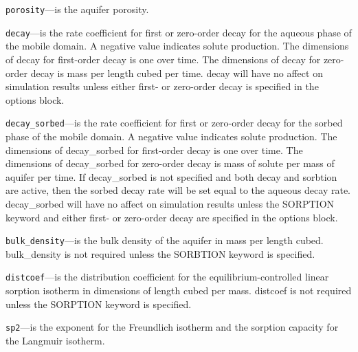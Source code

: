 \begin{description}
\item \texttt{porosity}---is the aquifer porosity.

\item \texttt{decay}---is the rate coefficient for first or zero-order decay for the aqueous phase of the mobile domain.  A negative value indicates solute production.  The dimensions of decay for first-order decay is one over time.  The dimensions of decay for zero-order decay is mass per length cubed per time.  decay will have no affect on simulation results unless either first- or zero-order decay is specified in the options block.

\item \texttt{decay\_sorbed}---is the rate coefficient for first or zero-order decay for the sorbed phase of the mobile domain.  A negative value indicates solute production.  The dimensions of decay\_sorbed for first-order decay is one over time.  The dimensions of decay\_sorbed for zero-order decay is mass of solute per mass of aquifer per time.  If decay\_sorbed is not specified and both decay and sorbtion are active, then the sorbed decay rate will be set equal to the aqueous decay rate.  decay\_sorbed will have no affect on simulation results unless the SORPTION keyword and either first- or zero-order decay are specified in the options block.

\item \texttt{bulk\_density}---is the bulk density of the aquifer in mass per length cubed.  bulk\_density is not required unless the SORBTION keyword is specified.

\item \texttt{distcoef}---is the distribution coefficient for the equilibrium-controlled linear sorption isotherm in dimensions of length cubed per mass.  distcoef is not required unless the SORPTION keyword is specified.

\item \texttt{sp2}---is the exponent for the Freundlich isotherm and the sorption capacity for the Langmuir isotherm.

\end{description}

